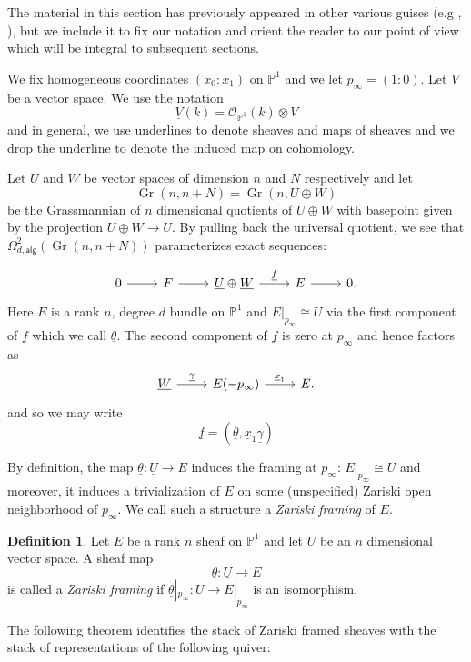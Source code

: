 \documentclass{amsart}
\theoremstyle{definition}
\newtheorem{definition}[theorem]{Definition}
\newcommand{\PP}{\mathbb{P}}
\newcommand{\OO}{\mathcal{O}}
\newcommand{\UL}[1]{\underline{#1}}
\newcommand{\alg}{\mathsf{alg}}
\newcommand{\Gr}{\operatorname{Gr}}
\newcommand{\LoopTwo}{\Omega^{2}_{d,\alg}}
\begin{document}
The material in this section has previously appeared in other various
guises (e.g \cite[\S~5]{Larson-Vakil-BottPeriodicity}, \cite[\S~3]{Nakajima-Handsaw}),
but we include it to fix our notation and orient the reader to our
point of view which will be integral to subsequent sections.



We fix homogeneous coordinates $(x_{0}:x_{1})$ on $\PP^{1}$ and we let
$p_{\infty }=(1:0)$. Let $V$ be a vector space. We use the notation
\[
\UL{V}(k) = \OO_{\PP^{1}}(k)\otimes V
\]
and in general, we use underlines to denote sheaves and maps of
sheaves and we drop the underline to denote the induced map on cohomology.


Let $U$ and $W$ be vector spaces of dimension $n$ and $N$ respectively
and let
\[
\Gr (n,n+N) = \Gr (n,U\oplus W)
\]
be the Grassmannian of $n$ dimensional quotients of $U\oplus W$ with
basepoint given by the projection $U\oplus W\to U$. By pulling back
the universal quotient, we see that $\LoopTwo (\Gr (n,n+N))$
parameterizes exact sequences:

\[
\begin{tikzcd}
0\arrow[r]& F \arrow[r]& \UL{U}\oplus \UL{W} \arrow{r}{\UL{f} } &E
\arrow[r]& 0.
\end{tikzcd}
\]
Here $E$ is a rank $n$, degree $d$ bundle on $\PP^{1}$ and
$E|_{p_{\infty}}\cong U$ via the first component of $\UL{f}$ which we
call $\UL{\theta}$. The second component of $\UL{f}$ is zero at
$p_{\infty}$ and hence factors as
\[
\begin{tikzcd}
 \UL{W} \arrow[r,"\UL{\gamma }"]& E(-p_{\infty})
 \arrow[r,"\UL{x}_{1}"] &E. 
\end{tikzcd}
\]
and so we may write
\[
\UL{f}
=({\UL{\theta}},\UL{x}_{1}\UL{\gamma })
\]

By definition, the map $\UL{\theta}:\UL{U}\to E$ induces the framing
at $p_{\infty}$: $E|_{p_{\infty}}\cong U$ and moreover, it induces a
trivialization of $E$ on some (unspecified) Zariski open neighborhood
of $p_{\infty}$. We call such a structure a \emph{Zariski framing} of $E$.

\begin{definition}\label{defn: Zariski framing}
Let $E$ be a rank $n$ sheaf on $\PP^{1}$ and let $U$ be an $n$
dimensional vector space. A sheaf map
\[
\UL{\theta}: \UL{U}\to E
\]
is called a \emph{Zariski framing} if $\UL{\theta}|_{p_{\infty}}:U \to
E|_{p_{\infty}}$ is an isomorphism.
\end{definition}

The following theorem identifies the stack of Zariski framed sheaves
with the stack of representations of the following quiver:
\end{document}
